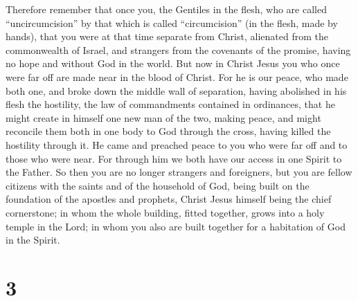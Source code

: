  Therefore remember that once you, the Gentiles in the
flesh, who are called ``uncircumcision'' by that which is called
``circumcision'' (in the flesh, made by hands),  that you
were at that time separate from Christ, alienated from the commonwealth
of Israel, and strangers from the covenants of the promise, having no
hope and without God in the world.  But now in Christ
Jesus you who once were far off are made near in the blood of Christ.
 For he is our peace, who made both one, and broke down
the middle wall of separation,  having abolished in his
flesh the hostility, the law of commandments contained in ordinances,
that he might create in himself one new man of the two, making peace,
 and might reconcile them both in one body to God through
the cross, having killed the hostility through it.  He
came and preached peace to you who were far off and to those who were
near.  For through him we both have our access in one
Spirit to the Father.  So then you are no longer
strangers and foreigners, but you are fellow citizens with the saints
and of the household of God,  being built on the
foundation of the apostles and prophets, Christ Jesus himself being the
chief cornerstone;  in whom the whole building, fitted
together, grows into a holy temple in the Lord;  in whom
you also are built together for a habitation of God in the Spirit.

\hypertarget{section-2}{%
\section{3}\label{section-2}}

